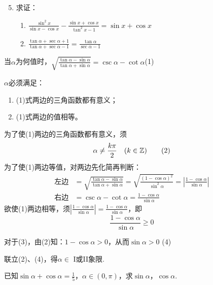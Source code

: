 \begin{enumerate}\setcounter{enumi}{4}
    \item 求证：
\begin{enumerate}[(1)]
    \item $\frac{\sin^2 x}{\sin x-\cos x}-\frac{\sin x+\cos x}{\tan^2 x-1}=\sin x+\cos x$
    \item $\frac{\tan\alpha+\sec\alpha+1}{\tan\alpha+\sec\alpha-1}=\frac{\tan\alpha}{\sec\alpha-1}$
\end{enumerate}
\end{enumerate}

\begin{example}
     当$\alpha$为何值时，$\sqrt{\frac{\tan\alpha-\sin\alpha}{\tan\alpha+\sin\alpha}}=\csc\alpha-\cot\alpha$\hfill(1)
\end{example}

\begin{analyze}
$\alpha$必须满足：
\begin{enumerate}[(1)]
    \item (1)式两边的三角函数都有意义；
    \item (1)式两边的值相等。
\end{enumerate}
\end{analyze}

\begin{solution}
    为了使(1)两边的三角函数都有意义，须
\begin{equation}
    \alpha\ne \dfrac{k\pi}{2}\quad (k\in\mathbb{Z})\tag{2}
\end{equation}
为了使(1)两边等值，对两边先化简再判断：
\[\begin{split}
    \text{左边}&=\sqrt{\frac{\tan\alpha-\sin\alpha}{\tan\alpha+\sin\alpha}}=\sqrt{\frac{(1-\cos\alpha)^2}{\sin^2\alpha}}=\left|\frac{1-\cos\alpha}{\sin\alpha}\right|\\
\text{右边}&=\csc\alpha-\cot\alpha=\frac{1-\cos\alpha}{\sin\alpha}    
\end{split}\]
欲使(1)两边相等，须$\left|\frac{1-\cos\alpha}{\sin\alpha}\right|=\frac{1-\cos\alpha}{\sin\alpha}$，即
\begin{equation}
    \frac{1-\cos\alpha}{\sin\alpha}\ge 0 \tag{3}
\end{equation}

对于(3)，由(2)知：$1-\cos\alpha>0$，从而$\sin\alpha>0$
     \hfill(4)

联立(2)、(4)，得$\alpha\in$ I或II象限.
\end{solution}

\begin{example}
已知$\sin\alpha+\cos\alpha=\frac{1}{5}$，$\alpha\in(0,\pi)$，求$\sin\alpha$，$\cos\alpha$.
\end{example}

